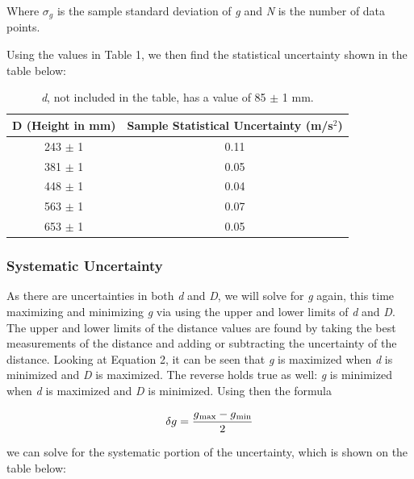 \documentclass[titlepage]{article}
\begin{document}
Where $\sigma_g$ is the sample standard deviation of \textit{g} and \textit{N} is the number of data points. 

\pagebreak

Using the values in Table 1, we then find the statistical uncertainty shown in the table below:

\begin{table}[!htbp]
\renewcommand{\arraystretch}{1.3}
\centering
\begin{tabular}{c|c}
    \hline
    \hline
    D (Height in mm) & Sample Statistical Uncertainty (m/s$^2$)\\
    \hline
    \hline

    243 $\pm$ 1    &  0.11 \\
    \hline

    381 $\pm$ 1    &  0.05 \\
    \hline

    448 $\pm$ 1   &  0.04\\
    \hline

    563 $\pm$ 1   &  0.07\\
    \hline

    653 $\pm$ 1  &  0.05\\
    \hline
\end{tabular}
\caption{\textit{d}, not included in the table, has a value of 85 $\pm$ 1 mm.}
\end{table}

\subsubsection{Systematic Uncertainty}
As there are uncertainties in both \textit{d} and \textit{D}, we will solve for \textit{g} again, this time maximizing and minimizing \textit{g} via using the upper and lower limits of \textit{d} and \textit{D}. The upper and lower limits of the distance values are found by taking the best measurements of the distance and adding or subtracting the uncertainty of the distance. Looking at Equation 2, it can be seen that \textit{g} is maximized when \textit{d} is minimized and \textit{D} is maximized. The reverse holds true as well: \textit{g} is minimized when \textit{d} is maximized and \textit{D} is minimized. Using then the formula

\begin{align}
    \delta g = \frac{g\textsubscript{max} - g\textsubscript{min}}{2}
\end{align}

we can solve for the systematic portion of the uncertainty, which is shown on the table below:
\end{document}
